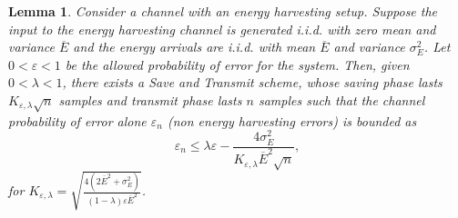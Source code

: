\documentclass[conference]{IEEEtran}
\newtheorem{lem}{Lemma}
\begin{document}
\begin{lem}\label{ehlem1}
Consider a channel with an energy harvesting setup. Suppose the input to the energy harvesting channel is generated i.i.d. with zero mean and variance $\overline{E}$ and the energy arrivals are i.i.d. with mean $\overline{E}$ and variance $\sigma_E^2$. Let $0<\varepsilon<1$ be the allowed probability of error for the system. Then, given $0<\lambda<1$, there exists a Save and Transmit scheme, whose saving phase lasts $K_{\varepsilon,\lambda}\sqrt{n}$ samples and transmit phase lasts $n$ samples such that the channel probability of error alone $\varepsilon_{n}$ (non energy harvesting errors) is bounded as
\begin{equation}
	\varepsilon_{n} \leq \lambda \varepsilon - \frac{4\sigma_E^2}{K_{\varepsilon,\lambda}\overline{E}^2\sqrt{n}}, \label{ener1}
\end{equation}
for $K_{\varepsilon,\lambda}=\sqrt{\frac{4(2\overline{E}^2+\sigma_E^2)}{(1-\lambda)\varepsilon\overline{E}^2}}$.
\end{lem}



\end{document}
